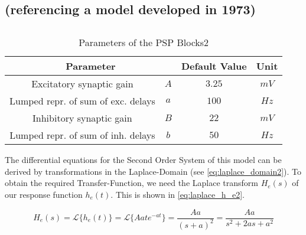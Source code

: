 \subsection{\parencite{zetterberg_performance_1978} (referencing a model developed in 1973)}

\subsection{\parencite{lopes_da_silva_model_1974}}



\subsection{\parencite{jansen_electroencephalogram_1995}}


\begin{table}[H]
	\centering
	\begin{tabular}{ |c|c|c|c| } 
		\hline
		\multicolumn{2}{|c|}{Parameter}  & Default Value & Unit \\
		\hline
		\hline
		Excitatory synaptic gain & \(A\) & \(3.25\) & \(mV\) \\
		\hline
		Lumped repr. of sum of exc. delays & \(a\) & \(100\) & \(Hz\) \\
		\hline
		Inhibitory synaptic gain & \(B\) & \(22\) & \(mV\) \\
		\hline
		Lumped repr. of sum of inh. delays & \(b\) & \(50\) & \(Hz\) \\
		\hline
	\end{tabular}
	\caption{Parameters of the PSP Blocks2}
	\label{table:psp_params2}
\end{table}

The differential equations for the Second Order System  of this model can be derived by transformations in the Laplace-Domain (see \ref{eq:laplace_domain2}). To obtain the required Transfer-Function, we need the Laplace transform $H_e(s)$ of our response function $h_e(t)$. This is shown in \ref{eq:laplace_h_e2}.


\begin{equation}
	H_e(s) =\mathscr{L}\{h_e(t)\}  = \mathscr{L}\{Aate^{-at} \} = \frac{Aa}{(s+a)^2} = \frac{Aa}{s^2+2as+a^2}\label{eq:laplace_h_e2}
\end{equation}



